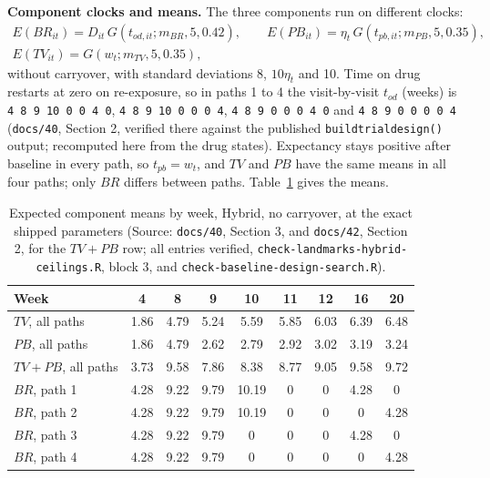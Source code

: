\documentclass[11pt]{article}
\newcommand{\code}[1]{\texttt{#1}}
\begin{document}
\textbf{Component clocks and means.} The three components run on
different clocks:
\begin{equation}
\begin{gathered}
E(BR_{it}) = D_{it}\, G(t_{od,it}; m_{BR}, 5, 0.42), \qquad
E(PB_{it}) = \eta_t\, G(t_{pb,it}; m_{PB}, 5, 0.35), \\
E(TV_{it}) = G(w_t; m_{TV}, 5, 0.35),
\end{gathered}
\label{eq:invc-clocks}
\end{equation}
without carryover, with standard deviations 8, $10\eta_t$ and 10. Time
on drug restarts at zero on re-exposure, so in paths 1 to 4 the
visit-by-visit $t_{od}$ (weeks) is \code{4 8 9 10 0 0 4 0},
\code{4 8 9 10 0 0 0 4}, \code{4 8 9 0 0 0 4 0} and
\code{4 8 9 0 0 0 0 4} (\code{docs/40}, Section 2, verified there
against the published \code{buildtrialdesign()} output; recomputed
here from the drug states). Expectancy stays positive after baseline in every path, so
$t_{pb} = w_t$, and $TV$ and $PB$ have the same means in all four
paths; only $BR$ differs between paths. Table~\ref{tab:invc-means}
gives the means.

\begin{table}[h]
\centering\small
\caption{Expected component means by week, Hybrid, no carryover, at
the exact shipped parameters (Source: \code{docs/40}, Section 3, and
\code{docs/42}, Section 2, for the $TV + PB$ row; all entries verified,
\code{check-landmarks-hybrid-ceilings.R}, block 3, and \code{check-baseline-design-search.R}).}
\label{tab:invc-means}
\begin{tabular}{@{}lcccccccc@{}}
\toprule
Week & 4 & 8 & 9 & 10 & 11 & 12 & 16 & 20 \\
\midrule
$TV$, all paths & 1.86 & 4.79 & 5.24 & 5.59 & 5.85 & 6.03 & 6.39 & 6.48 \\
$PB$, all paths & 1.86 & 4.79 & 2.62 & 2.79 & 2.92 & 3.02 & 3.19 & 3.24 \\
$TV + PB$, all paths & 3.73 & 9.58 & 7.86 & 8.38 & 8.77 & 9.05 & 9.58 & 9.72 \\
$BR$, path 1 & 4.28 & 9.22 & 9.79 & 10.19 & 0 & 0 & 4.28 & 0 \\
$BR$, path 2 & 4.28 & 9.22 & 9.79 & 10.19 & 0 & 0 & 0 & 4.28 \\
$BR$, path 3 & 4.28 & 9.22 & 9.79 & 0 & 0 & 0 & 4.28 & 0 \\
$BR$, path 4 & 4.28 & 9.22 & 9.79 & 0 & 0 & 0 & 0 & 4.28 \\
\bottomrule
\end{tabular}
\end{table}
\end{document}

